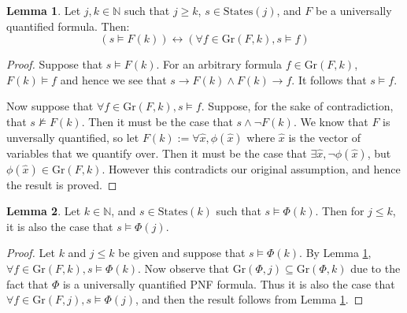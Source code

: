 \documentclass[12pt]{article}
\theoremstyle{definition}
\newtheorem{lemma}{Lemma}
\theoremstyle{remark}
\newcommand{\states}{\text{States}}
\newcommand{\gr}{\text{Gr}}
\begin{document}
\begin{lemma}
  \label{lem:pnf-ground}
  Let $j,k \in \mathbb{N}$ such that $j \geq k$, $s \in \states(j)$, and $F$ be a universally quantified formula.  Then:
  $$(s \models F(k)) \leftrightarrow (\forall f \in \gr(F,k), s \models f)$$
\end{lemma}
\begin{proof}
  Suppose that $s \models F(k)$.  For an arbitrary formula $f \in \gr(F,k)$, $F(k) \models f$ and hence we see that $s \rightarrow F(k) \land F(k) \rightarrow f$.  It follows that $s \models f$.

  Now suppose that $\forall f \in \gr(F,k), s \models f$.  Suppose, for the sake of contradiction, that $s \not\models F(k)$.  Then it must be the case that $s \land \neg F(k)$.  We know that $F$ is unversally quantified, so let $F(k) := \forall \hat{x}, \phi(\hat{x})$ where $\hat{x}$ is the vector of variables that we quantify over.  Then it must be the case that $\exists \hat{x}, \neg \phi(\hat{x})$, but $\phi(\hat{x}) \in \gr(F,k)$.  However this contradicts our original assumption, and hence the result is proved.
\end{proof}

\begin{lemma}
  \label{lem:lt-sat}
  Let $k \in \mathbb{N}$, and $s \in \states(k)$ such that $s \models \Phi(k)$.  Then for $j \leq k$, it is also the case that $s \models \Phi(j)$.
\end{lemma}
\begin{proof}
  Let $k$ and $j \leq k$ be given and suppose that $s \models \Phi(k)$.  By Lemma \ref{lem:pnf-ground}, $\forall f \in \gr(F,k), s \models \Phi(k)$.  Now observe that $\gr(\Phi,j) \subseteq \gr(\Phi,k)$ due to the fact that $\Phi$ is a universally quantified PNF formula.  Thus it is also the case that $\forall f \in \gr(F,j), s \models \Phi(j)$, and then the result follows from Lemma \ref{lem:pnf-ground}.
\end{proof}
\end{document}
